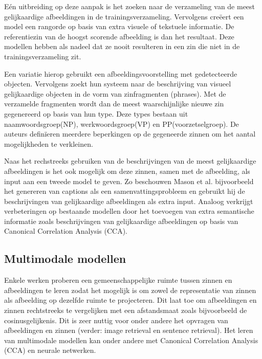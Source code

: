 E\'en uitbreiding op deze aanpak is het zoeken naar de verzameling van de meest gelijkaardige afbeeldingen in de trainingsverzameling. Vervolgens cre\"eert een model een rangorde op basis van extra visuele of tekstuele informatie. De referentiezin van de hoogst scorende afbeelding is dan het resultaat. \cite{Ordonez2011,Oliva2006,Hodosh2013,Devlin2015a}
Deze modellen hebben als nadeel dat ze nooit resulteren in een zin die niet in de trainingsverzameling zit.

Een variatie hierop \cite{Kuznetsova2012,Gupta2012} gebruikt een afbeeldingsvoorstelling met gedetecteerde objecten. Vervolgens zoekt hun systeem naar de beschrijving van visueel gelijkaardige objecten in de vorm van zinfragmenten (phrases). Met de verzamelde fragmenten wordt dan de meest waarschijnlijke nieuwe zin gegenereerd op basis van hun type. Deze types bestaan uit naamwoordsgroep(NP), werkwoordsgroep(VP) en PP(voorzetselgroep). De auteurs defin\"ieren meerdere beperkingen op de gegeneerde zinnen om het aantal mogelijkheden te verkleinen.

Naas het rechstreeks gebruiken van de beschrijvingen van de meest gelijkaardige afbeeldingen is het ook mogelijk om deze zinnen, samen met de afbeelding, als input aan een tweede model te geven. Zo beschouwen Mason et al.\cite{Mason2014} bijvoorbeeld het genereren van captions als een samenvattingsprobleem en gebruikt hij de beschrijvingen van gelijkaardige afbeeldingen als extra input. Analoog verkrijgt \cite{Fernando2015} verbeteringen op bestaande modellen door het toevoegen van extra semantische informatie zoals beschrijvingen van gelijkaardige afbeeldingen op basis van Canonical Correlation Analysis (CCA).
 
\subsection{Multimodale modellen}
Enkele werken proberen een gemeenschappelijke ruimte tussen zinnen en afbeeldingen te leren zodat het mogelijk is om zowel de representatie van zinnen als afbeelding op dezelfde ruimte te projecteren. Dit laat toe om afbeeldingen en zinnen rechtstreeks te vergelijken met een afstandsmaat zoals bijvoorbeeld de cosinusgelijkenis. Dit is zeer nuttig voor onder andere het opvragen van afbeeldingen en zinnen (verder: image retrieval en sentence retrieval). Het leren van multimodale modellen kan onder andere met Canonical Correlation Analysis (CCA)\cite{Hodosh2013} en neurale netwerken. \cite{Mao2014,Karpathy2014,Kiros2013}

